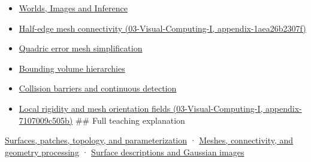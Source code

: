 \begin{itemize}
\item
  \href{Continuous\%20Notes/University\%20-\%20Worlds,\%20Images\%20and\%20Inference\%20-\%20Graphics,\%20Vision\%20and\%20Photography}{Worlds, Images and Inference}
\item
  \href{}{Half-edge mesh connectivity (03-Visual-Computing-I, appendix-1aea26b2307f)}
\item
  \hyperref[appendix-1dd4ad54ca57]{Quadric error mesh simplification}
\item
  \hyperref[appendix-0b426c47dd78]{Bounding volume hierarchies}
\item
  \hyperref[appendix-a9ba01fa72a6]{Collision barriers and continuous detection}
\item
  \href{}{Local rigidity and mesh orientation fields (03-Visual-Computing-I, appendix-7107009c505b)} \#\# Full teaching explanation
\end{itemize}

\href{Continuous\%20Notes/University\%20-\%20Worlds,\%20Images\%20and\%20Inference\%20-\%20Graphics,\%20Vision\%20and\%20Photography\#Surfaces,\%20patches,\%20topology,\%20and\%20parameterization}{Surfaces, patches, topology, and parameterization} · \href{Continuous\%20Notes/University\%20-\%20Worlds,\%20Images\%20and\%20Inference\%20-\%20Graphics,\%20Vision\%20and\%20Photography\#Meshes,\%20connectivity,\%20and\%20geometry\%20processing}{Meshes, connectivity, and geometry processing} · \href{Continuous\%20Notes/University\%20-\%20Worlds,\%20Images\%20and\%20Inference\%20-\%20Graphics,\%20Vision\%20and\%20Photography\#Surface\%20descriptions\%20and\%20Gaussian\%20images}{Surface descriptions and Gaussian images}
